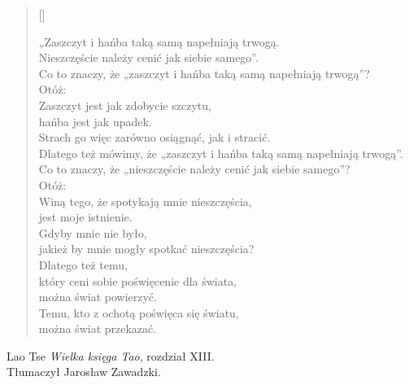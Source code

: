 \documentclass[a4paper,11pt]{article}
\newcommand{\attribB}[1]{#1}
\begin{document}
\begin{verse}[\versewidth]

  „Zaszczyt i hańba taką samą napełniają trwogą. \\
  Nieszczęście należy cenić jak siebie samego”. \\
  Co to znaczy, że „zaszczyt i hańba taką samą napełniają trwogą”? \\
  Otóż: \\
  Zaszczyt jest jak zdobycie szczytu, \\
  hańba jest jak upadek. \\
  Strach go więc zarówno osiągnąć, jak i stracić. \\
  Dlatego też mówimy, że „zaszczyt i hańba taką samą napełniają
  trwogą”. \\
  Co to znaczy, że „nieszczęście należy cenić jak siebie samego”? \\
  Otóż: \\
  Winą tego, że spotykają mnie nieszczęścia, \\
  jest moje istnienie. \\
  Gdyby mnie nie było, \\
  jakież by mnie mogły spotkać nieszczęścia? \\
  Dlatego też temu, \\
  który ceni sobie poświęcenie dla świata, \\
  można świat powierzyć. \\
  Temu, kto z ochotą poświęca się światu, \\
  można świat przekazać.

\end{verse}


\attribB{Lao Tse \emph{Wielka księga Tao}, rozdział XIII. \\
  Tłumaczył Jarosław Zawadzki.}
\end{document}
